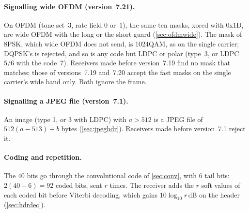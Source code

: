 \documentclass[11pt,a4paper]{article}
\theoremstyle{remark}
\begin{document}
\paragraph{Signalling wide OFDM (version~7.21).}
On OFDM (tone set~3, rate field 0 or~1), the same ten masks, xored with 0x1D, are wide OFDM with the long or the short guard (\cref{sec:ofdmwide}). The mask of 8PSK, which wide OFDM does not send, is 1024QAM, as on the single carrier; DQPSK's is rejected, and so is any code but LDPC or polar (type~3, or LDPC $5/6$ with the code~7). Receivers made before version~7.19 find no mask that matches; those of versions~7.19 and~7.20 accept the fast masks on the single carrier's wide band only. Both ignore the frame.

\paragraph{Signalling a JPEG file (version~7.1).}
An image (type 1, or 3 with LDPC) with $a > 512$ is a JPEG file of $512(a - 513) + b$ bytes (\cref{sec:jpeghdr}). Receivers made before version~7.1 reject it.

\paragraph{Coding and repetition.}
The 40 bits go through the convolutional code of \cref{sec:conv}, with 6 tail bits: $2(40+6) = 92$ coded bits, sent $r$ times. The receiver adds the $r$ soft values of each coded bit before Viterbi decoding, which gains $10\log_{10} r$\,dB on the header (\cref{sec:hdrdec}).
\end{document}
